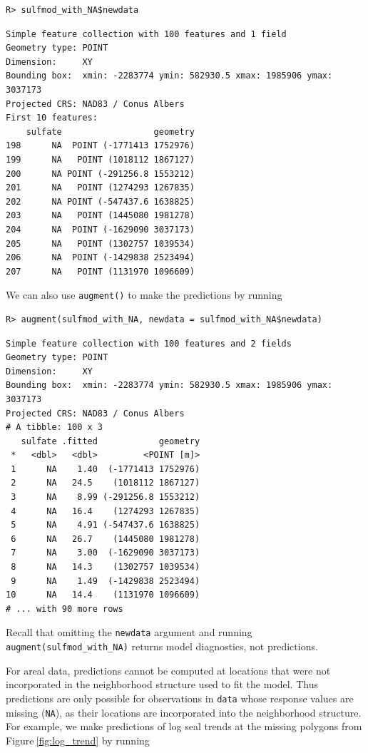 \documentclass{article}
\begin{document}
\begin{verbatim}
R> sulfmod_with_NA$newdata
\end{verbatim}

\begin{verbatim}
Simple feature collection with 100 features and 1 field
Geometry type: POINT
Dimension:     XY
Bounding box:  xmin: -2283774 ymin: 582930.5 xmax: 1985906 ymax: 3037173
Projected CRS: NAD83 / Conus Albers
First 10 features:
    sulfate                  geometry
198      NA  POINT (-1771413 1752976)
199      NA   POINT (1018112 1867127)
200      NA POINT (-291256.8 1553212)
201      NA   POINT (1274293 1267835)
202      NA POINT (-547437.6 1638825)
203      NA   POINT (1445080 1981278)
204      NA  POINT (-1629090 3037173)
205      NA   POINT (1302757 1039534)
206      NA  POINT (-1429838 2523494)
207      NA   POINT (1131970 1096609)
\end{verbatim}

We can also use \texttt{augment()} to make the predictions by running

\begin{verbatim}
R> augment(sulfmod_with_NA, newdata = sulfmod_with_NA$newdata)
\end{verbatim}

\begin{verbatim}
Simple feature collection with 100 features and 2 fields
Geometry type: POINT
Dimension:     XY
Bounding box:  xmin: -2283774 ymin: 582930.5 xmax: 1985906 ymax: 3037173
Projected CRS: NAD83 / Conus Albers
# A tibble: 100 x 3
   sulfate .fitted            geometry
 *   <dbl>   <dbl>         <POINT [m]>
 1      NA    1.40  (-1771413 1752976)
 2      NA   24.5    (1018112 1867127)
 3      NA    8.99 (-291256.8 1553212)
 4      NA   16.4    (1274293 1267835)
 5      NA    4.91 (-547437.6 1638825)
 6      NA   26.7    (1445080 1981278)
 7      NA    3.00  (-1629090 3037173)
 8      NA   14.3    (1302757 1039534)
 9      NA    1.49  (-1429838 2523494)
10      NA   14.4    (1131970 1096609)
# ... with 90 more rows
\end{verbatim}

Recall that omitting the \texttt{newdata} argument and running
\texttt{augment(sulfmod\_with\_NA)} returns model diagnostics, not
predictions.

For areal data, predictions cannot be computed at locations that were
not incorporated in the neighborhood structure used to fit the model.
Thus predictions are only possible for observations in \texttt{data}
whose response values are missing (\texttt{NA}), as their locations are
incorporated into the neighborhood structure. For example, we make
predictions of log seal trends at the missing polygons from
Figure\(~\)\ref{fig:log_trend} by running
\end{document}
